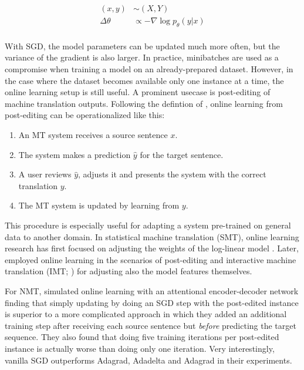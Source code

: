 \begin{align}
  (x,y) &\sim (X,Y)\\
  \Delta \theta &\propto -\nabla \log p_{\theta}(y|x)\\
\end{align}

With SGD, the model parameters can be updated much more often, but the variance
of the gradient is also larger. In practice, minibatches are used as a
compromise when training a model on an already-prepared dataset. However, in the
case where the dataset becomes available only one instance at a time, the online
learning setup is still useful. A prominent usecase is post-editing of machine
translation outputs. Following the defintion of \textcite{ortiz-martinez-2016},
online learning from post-editing can be operationalized like this:

\begin{enumerate}
\item An MT system receives a source sentence \(x\).
\item The system makes a prediction \(\hat{y}\) for the target sentence.
\item A user reviews \(\hat{y}\), adjusts it and presents the system with the
  correct translation \(y\).
\item The MT system is updated by learning from \(y\).
\end{enumerate}


This procedure is especially useful for adapting a system pre-trained on general
data to another domain. In statistical machine translation (SMT), online
learning research has first focused on adjusting the weights of the log-linear
model \parencites(e.g.)(){liang-2006}{arun-2007}{watanabe-2007}. Later,
\textcites{ortiz-martinez-2010}{ortiz-martinez-2016} employed online learning in
the scenarios of post-editing and interactive machine translation (IMT;
\cites{casacuberta-2009}{barrachina-2009}) for adjusting also the model features
themselves.

For NMT, \textcite{turchi-2017} simulated online learning with an attentional
encoder-decoder network finding that simply updating by doing an SGD step with
the post-edited instance is superior to a more complicated approach in which
they added an additional training step after receiving each source sentence but
\emph{before} predicting the target sequence. They also found that doing five
training iterations per post-edited instance is actually worse than doing only
one iteration. Very interestingly, vanilla SGD outperforms Adagrad, Adadelta and
Adagrad in their experiments.  %

